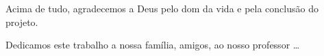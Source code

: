 \begin{agradecimentos}

Acima de tudo, agradecemos a Deus pelo dom da vida e pela conclusão do projeto.

Dedicamos este trabalho a nossa família, amigos, ao nosso professor \ldots

\end{agradecimentos}
